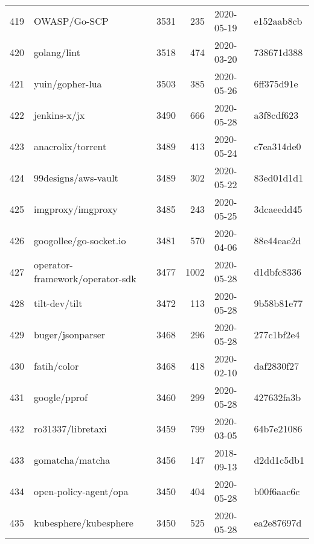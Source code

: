 \begin{footnotesize}
\begin{longtable}{llrrll}
        419 &                                       OWASP/Go-SCP &   3531 &    235 & 2020-05-19 &  e152aab8cb \\
        420 &                                        golang/lint &   3518 &    474 & 2020-03-20 &  738671d388 \\
        421 &                                    yuin/gopher-lua &   3503 &    385 & 2020-05-26 &  6ff375d91e \\
        422 &                                       jenkins-x/jx &   3490 &    666 & 2020-05-28 &  a3f8cdf623 \\
        423 &                                  anacrolix/torrent &   3489 &    413 & 2020-05-24 &  c7ea314de0 \\
        424 &                                99designs/aws-vault &   3489 &    302 & 2020-05-22 &  83ed01d1d1 \\
        425 &                                  imgproxy/imgproxy &   3485 &    243 & 2020-05-25 &  3dcaeedd45 \\
        426 &                             googollee/go-socket.io &   3481 &    570 & 2020-04-06 &  88e44eae2d \\
        427 &                    operator-framework/operator-sdk &   3477 &   1002 & 2020-05-28 &  d1dbfc8336 \\
        428 &                                      tilt-dev/tilt &   3472 &    113 & 2020-05-28 &  9b58b81e77 \\
        429 &                                   buger/jsonparser &   3468 &    296 & 2020-05-28 &  277c1bf2e4 \\
        430 &                                        fatih/color &   3468 &    418 & 2020-02-10 &  daf2830f27 \\
        431 &                                       google/pprof &   3460 &    299 & 2020-05-28 &  427632fa3b \\
        432 &                                  ro31337/libretaxi &   3459 &    799 & 2020-03-05 &  64b7e21086 \\
        433 &                                    gomatcha/matcha &   3456 &    147 & 2018-09-13 &  d2dd1c5db1 \\
        434 &                              open-policy-agent/opa &   3450 &    404 & 2020-05-28 &  b00f6aac6c \\
        435 &                              kubesphere/kubesphere &   3450 &    525 & 2020-05-28 &  ea2e87697d \\

\end{longtable}
\end{footnotesize}
